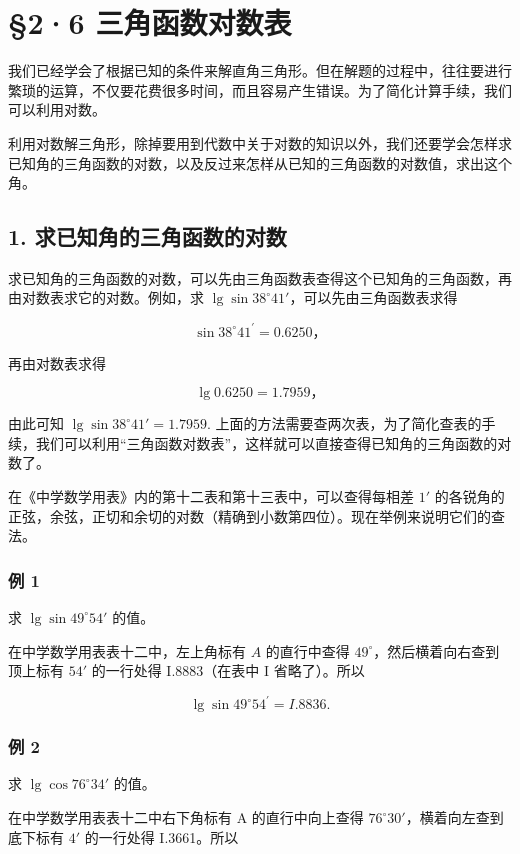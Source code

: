 \section{§2·6 三角函数对数表}

我们已经学会了根据已知的条件来解直角三角形。但在解题的过程中，往往要进行繁琐的运算，不仅要花费很多时间，而且容易产生错误。为了简化计算手续，我们可以利用对数。

利用对数解三角形，除掉要用到代数中关于对数的知识以外，我们还要学会怎样求已知角的三角函数的对数，以及反过来怎样从已知的三角函数的对数值，求出这个角。

\subsection{1. 求已知角的三角函数的对数}

求已知角的三角函数的对数，可以先由三角函数表查得这个已知角的三角函数，再由对数表求它的对数。例如，求
\(\lg \sin 38^{\circ}41'\)，可以先由三角函数表求得

\[
\sin 38 ^{\circ} 41 ^{\prime} = 0.6250\text{，}
\]

再由对数表求得

\[
\lg 0.6250 = 1.7959\text{，}
\]

由此可知 \(\lg \sin 38^{\circ}41' = 1.7959.\)
上面的方法需要查两次表，为了简化查表的手续，我们可以利用``三角函数对数表''，这样就可以直接查得已知角的三角函数的对数了。

在《中学数学用表》内的第十二表和第十三表中，可以查得每相差 \(1'\)
的各锐角的正弦，余弦，正切和余切的对数（精确到小数第四位）。现在举例来说明它们的查法。

\subsubsection{例 1}

求 \(\lg \sin 49^{\circ}54'\) 的值。

 在中学数学用表表十二中，左上角标有 \(A\) 的直行中查得
\(49^{\circ}\)，然后横着向右查到顶上标有 \(54'\) 的一行处得
I.8883（在表中 I 省略了）。所以

\[
\lg \sin 49 ^{\circ} 54 ^{\prime} = I. 8836.
\]

\subsubsection{例 2}

求 \(\lg \cos 76^{\circ}34'\) 的值。

 在中学数学用表表十二中右下角标有 A 的直行中向上查得
\(76^{\circ}30'\)，横着向左查到底下标有 \(4'\) 的一行处得 I.3661。所以

